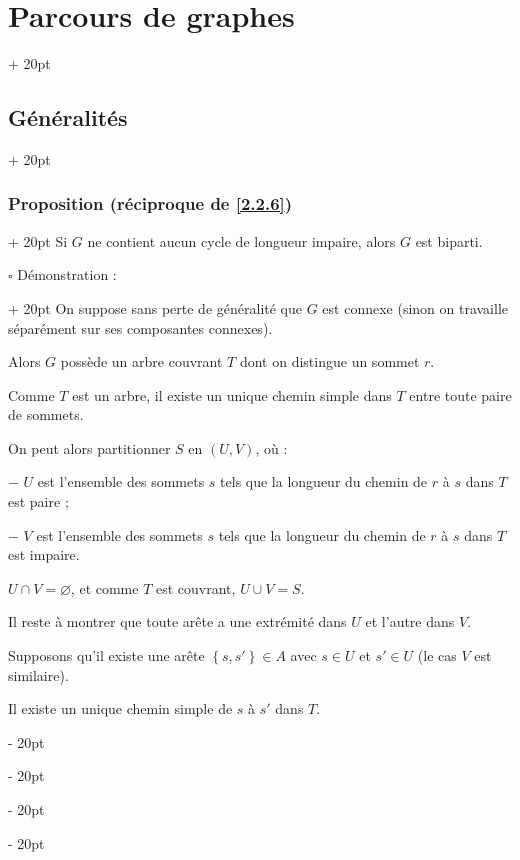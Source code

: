 \documentclass[a4paper, 12pt, twoside]{article}
\newcommand{\set}[1]{\left\{ #1 \right\}}
\newcommand{\ind}[1][20pt]{\advance\leftskip + #1}
\newcommand{\deind}[1][20pt]{\advance\leftskip - #1}
\newenvironment{indt}[2][20pt]{#2 \par \ind[#1]}{\par \deind} %
\begin{document}
\begin{indt}{\section{Parcours de graphes}}
\begin{indt}{\subsection{Généralités}}
\begin{indt}{\subsubsection{Proposition (réciproque de \ref{2.2.6})}}
                Si $G$ ne contient aucun cycle de longueur impaire, alors $G$ est biparti.

                \vspace{6pt}
                
                \begin{indt}{$\square$ Démonstration :}
                    On suppose sans perte de généralité que $G$ est connexe (sinon on travaille séparément sur ses composantes connexes).

                    Alors $G$ possède un arbre couvrant $T$ dont on distingue un sommet $r$.

                    Comme $T$ est un arbre, il existe un unique chemin simple dans $T$ entre toute paire de sommets.

                    \begin{center}
                    \end{center}


                    On peut alors partitionner $S$ en $(U, V)$, où :

                    $-$ $U$ est l'ensemble des sommets $s$ tels que la longueur du chemin de $r$ à $s$ dans $T$ est paire ;

                    $-$ $V$ est l'ensemble des sommets $s$ tels que la longueur du chemin de $r$ à $s$ dans $T$ est impaire.

                    $U \cap V = \varnothing$, et comme $T$ est couvrant, $U \cup V = S$.

                    Il reste à montrer que toute arête a une extrémité dans $U$ et l'autre dans $V$.

                    Supposons qu'il existe une arête $\set{s, s'} \in A$ avec $s \in U$ et $s' \in U$ (le cas $V$ est similaire).

                    Il existe un unique chemin simple de $s$ à $s'$ dans $T$.


\end{indt}
\end{indt}
\end{indt}
\end{indt}
\end{document}
